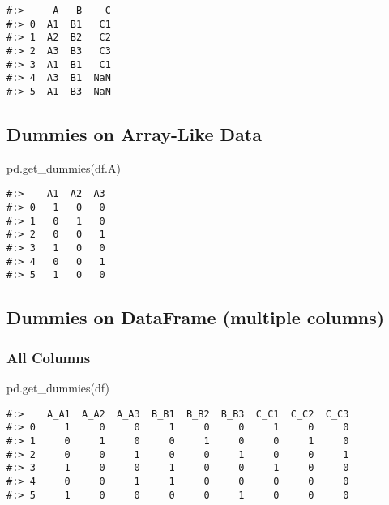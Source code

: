 \documentclass[
]{book}
\newenvironment{Shaded}{\begin{snugshade}}{\end{snugshade}}
\newcommand{\NormalTok}[1]{#1}
\begin{document}
\begin{verbatim}
#:>     A   B    C
#:> 0  A1  B1   C1
#:> 1  A2  B2   C2
#:> 2  A3  B3   C3
#:> 3  A1  B1   C1
#:> 4  A3  B1  NaN
#:> 5  A1  B3  NaN
\end{verbatim}

\hypertarget{dummies-on-array-like-data}{%
\subsection{Dummies on Array-Like Data}\label{dummies-on-array-like-data}}

\begin{Shaded}
\begin{Highlighting}[]
\NormalTok{pd.get\_dummies(df.A)}
\end{Highlighting}
\end{Shaded}

\begin{verbatim}
#:>    A1  A2  A3
#:> 0   1   0   0
#:> 1   0   1   0
#:> 2   0   0   1
#:> 3   1   0   0
#:> 4   0   0   1
#:> 5   1   0   0
\end{verbatim}

\hypertarget{dummies-on-dataframe-multiple-columns}{%
\subsection{Dummies on DataFrame (multiple columns)}\label{dummies-on-dataframe-multiple-columns}}

\hypertarget{all-columns}{%
\subsubsection{All Columns}\label{all-columns}}

\begin{Shaded}
\begin{Highlighting}[]
\NormalTok{pd.get\_dummies(df)}
\end{Highlighting}
\end{Shaded}

\begin{verbatim}
#:>    A_A1  A_A2  A_A3  B_B1  B_B2  B_B3  C_C1  C_C2  C_C3
#:> 0     1     0     0     1     0     0     1     0     0
#:> 1     0     1     0     0     1     0     0     1     0
#:> 2     0     0     1     0     0     1     0     0     1
#:> 3     1     0     0     1     0     0     1     0     0
#:> 4     0     0     1     1     0     0     0     0     0
#:> 5     1     0     0     0     0     1     0     0     0
\end{verbatim}
\end{document}
